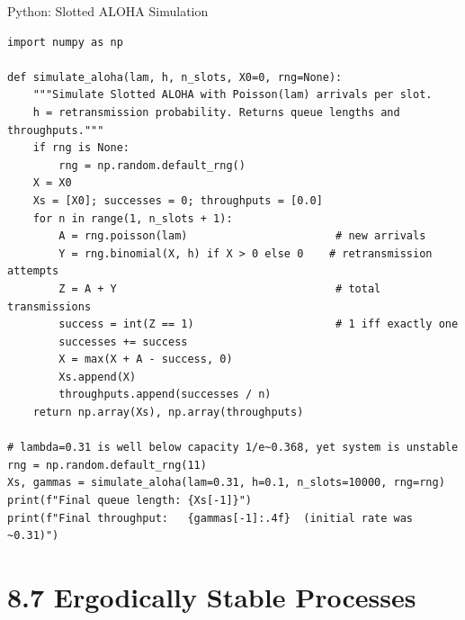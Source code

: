 \documentclass[aspectratio=169,10pt]{beamer}
\begin{document}
\begin{frame}[fragile]{Python: Slotted ALOHA Simulation}
\begin{lstlisting}[style=python]
import numpy as np

def simulate_aloha(lam, h, n_slots, X0=0, rng=None):
    """Simulate Slotted ALOHA with Poisson(lam) arrivals per slot.
    h = retransmission probability. Returns queue lengths and throughputs."""
    if rng is None:
        rng = np.random.default_rng()
    X = X0
    Xs = [X0]; successes = 0; throughputs = [0.0]
    for n in range(1, n_slots + 1):
        A = rng.poisson(lam)                       # new arrivals
        Y = rng.binomial(X, h) if X > 0 else 0    # retransmission attempts
        Z = A + Y                                  # total transmissions
        success = int(Z == 1)                      # 1 iff exactly one
        successes += success
        X = max(X + A - success, 0)
        Xs.append(X)
        throughputs.append(successes / n)
    return np.array(Xs), np.array(throughputs)

# lambda=0.31 is well below capacity 1/e~0.368, yet system is unstable
rng = np.random.default_rng(11)
Xs, gammas = simulate_aloha(lam=0.31, h=0.1, n_slots=10000, rng=rng)
print(f"Final queue length: {Xs[-1]}")
print(f"Final throughput:   {gammas[-1]:.4f}  (initial rate was ~0.31)")
\end{lstlisting}
\end{frame}

\section{8.7 Ergodically Stable Processes}
\end{document}

